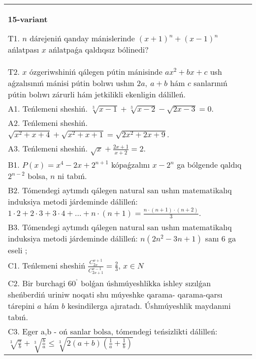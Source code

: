 \documentclass{article}
\begin{document}
\begin{tabular}{m{17cm}}
\textbf{15-variant}
\newline

T1. \(n\) dárejeniń qanday mánislerinde \((x + 1)^{n} + (x - 1)^{n}\) ańlatpası \(x\) ańlatpaǵa qaldıqsız bólinedi? \\
T2. \(x\) ózgeriwshiniń qálegen pútin mánisinde \(ax^{2} + bx + c\) ush aǵzalısınıń mánisi pútin bolıwı ushın \(2a,\ a + b\) hám \(c\) sanlarınıń pútin bolıwı zárurli hám jetkilikli ekenligin dálilleń. \\
A1. Teńlemeni sheshiń. \(\sqrt[3]{x - 1} + \sqrt[3]{x - 2} - \sqrt{2x - 3} = 0\). \\
A2. Teńlemeni sheshiń. \(\sqrt{x^{2} + x + 4} + \sqrt{x^{2} + x + 1} = \sqrt{2x^{2} + 2x + 9}\). \\
A3. Teńlemeni sheshiń. \(\sqrt{x} + \frac{2x + 1}{x + 2} = 2\). \\
B1. \(P(x) = x^{4} - 2x + 2^{n + 1}\) kópaǵzalını \(x - 2^{n}\) ga bólgende qaldıq \(2^{n - 2}\) bolsa, \(n\) ni tabıń. \\
B2. Tómendegi aytımdı qálegen natural san ushın matematikalıq induksiya metodi járdeminde dálilleń: \(1 \cdot 2 + 2 \cdot 3 + 3 \cdot 4 + \ldots + n \cdot (n + 1) = \frac{n \cdot (n + 1) \cdot (n + 2)}{3}\). \\
B3. Tómendegi aytımdı qálegen natural san ushın matematikalıq induksiya metodi járdeminde dálilleń: \(n\left( 2n^{2} - 3n + 1 \right)\) sanı 6 ga eseli ; \\
C1. Teńlemeni sheshiń \(\frac{C_{2x}^{x + 1}}{C_{2x + 1}^{x - 1}} = \frac{2}{3}\), \(x \in N\) \\
C2. Bir burchagi \(60^{{^\circ}}\) bolǵan úshmúyeshlikka ishley sızılǵan sheńberdiń uriniw noqati shu múyeshke qarama- qarama-qarsı tárepini \(a\) hám \(b\) kesindilerga ajıratadı. Úshmúyeshlik maydanıni tabıń. \\
C3. Eger a,b - oń sanlar bolsa, tómendegi teńsizlikti dálilleń: \(\sqrt[3]{\frac{a}{b}} + \sqrt[3]{\frac{b}{a}} \leq \sqrt[3]{2(a + b)\left( \frac{1}{a} + \frac{1}{b} \right)}\) \\

\end{tabular}
\vspace{1cm}
\end{document}
